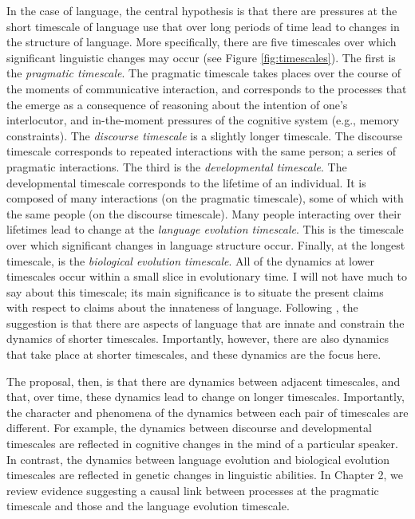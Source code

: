 In the case of language, the central  hypothesis is that there are pressures at the short timescale of language use  that over long periods of time lead to changes in the structure of language. More specifically,  there are five timescales over which significant linguistic changes may occur (see Figure \ref{fig:timescales}). The first is the {\it pragmatic timescale}. The pragmatic timescale takes places over the course of the moments of communicative interaction, and corresponds to the processes  that the emerge as a consequence of reasoning about the intention of one's interlocutor, and in-the-moment pressures of the cognitive system (e.g., memory constraints).  The {\it discourse timescale} is a slightly longer timescale. The discourse timescale corresponds to repeated interactions with the same person; a series of pragmatic interactions. The third is the {\it developmental timescale}. The developmental timescale corresponds to the lifetime of an individual. It is composed of many interactions (on the pragmatic timescale), some of which with the same people (on the discourse timescale).  Many people interacting over their lifetimes lead to change at the {\it language evolution timescale}. This is the timescale over which significant changes in language structure  occur. Finally, at the longest timescale, is the {\it biological evolution timescale}. All of the dynamics at lower timescales occur within a small slice in evolutionary time. I will not have much to say about this timescale; its main significance is to situate the present claims with respect to claims about the innateness of language. Following , the suggestion is that there are aspects of language that are innate and constrain the dynamics of shorter timescales. Importantly, however, there are also  dynamics that take place at  shorter timescales, and these dynamics are the focus here.

The proposal, then, is that there are dynamics between adjacent timescales, and that, over time, these dynamics lead to change on longer timescales.  Importantly, the character and phenomena of the dynamics between each pair of timescales are different. For example,  the dynamics between discourse and developmental timescales are reflected in cognitive changes in the mind of a particular speaker. In contrast, the dynamics between language evolution and biological evolution timescales are reflected in genetic changes in linguistic abilities. In Chapter 2, we review evidence suggesting a causal link between processes at the pragmatic timescale and those and the language evolution timescale.

